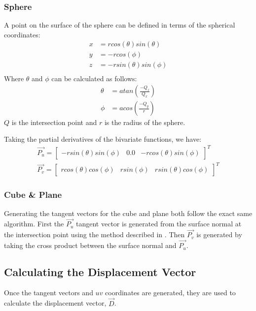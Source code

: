 \subsubsection*{Sphere}
A point on the surface of the sphere can be defined in terms of the spherical
coordinates:
\begin{equation}
\begin{split}
  x &= rcos(\theta)sin(\theta) \\
  y &= -rcos(\phi) \\
  z &= -rsin(\theta)sin(\phi) \\
\end{split}
\end{equation}
Where $\theta$ and $\phi$ can be calculated as follows:
\begin{equation}
\begin{split}
  \theta &= atan(\frac{-Q_{z}}{Q_{x}}) \\
  \phi &= acos(\frac{-Q_{y}}{r})
\end{split}
\end{equation}
$Q$ is the intersection point and $r$ is the radius of the sphere.

Taking the partial derivatives of the bivariate functions, we have:
\begin{equation}
\begin{split}
  \vec{P_{u}} = \begin{bmatrix} -rsin(\theta)sin(\phi) & 0.0 & 
  -rcos(\theta)sin(\phi) \end{bmatrix}^{T} \\
  \vec{P_{v}} = \begin{bmatrix} rcos(\theta)cos(\phi) & rsin(\phi) &
  rsin(\theta)cos(\phi) \end{bmatrix}^{T}
\end{split}
\end{equation}

\subsubsection*{Cube \& Plane}
Generating the tangent vectors for the cube and plane both follow the exact same
algorithm. First the $\vec{P_{u}}$ tangent vector is generated from the surface 
normal at the intersection point using the method described in 
\cite{6_hughes_moller_2005}. Then $\vec{P_{v}}$ is generated by taking the 
cross product between the surface normal and $\vec{P_{u}}$.

\subsection{Calculating the Displacement Vector}
Once the tangent vectors and $uv$ coordinates are generated, they are used to
calculate the displacement vector, $\vec{D}$.

